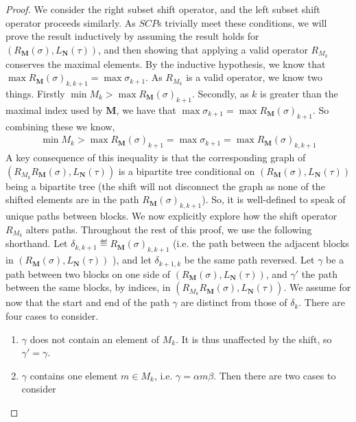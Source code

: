 \begin{proof}
We consider the right subset shift operator, and the left subset shift operator proceeds similarly.
As $SCP$s trivially meet these conditions, we will prove the result inductively by assuming the result holds for $(R_{\mathbf{M}}(\sigma),L_{\mathbf{N}}(\tau))$, and then showing that applying a valid operator $R_{M_k}$ conserves the maximal elements.
By the inductive hypothesis, we know that $\max R_{\mathbf{M}}(\sigma)_{k,k+1}= \max \sigma_{k+1}$.
As $R_{M_k}$ is a valid operator, we know two things.
Firstly $\min M_k > \max R_{\mathbf{M}}(\sigma)_{k+1}$.
Secondly, as $k$ is greater than the maximal index used by $\mathbf{M}$, we have that $\max \sigma_{k+1} = \max R_{\mathbf{M}}(\sigma)_{k+1}$.
So combining these we know, 
\begin{align}\label{eq:shift subset dominates adj path}
    \min M_k > \max R_{\mathbf{M}}(\sigma)_{k+1} = \max \sigma_{k+1} = \max R_{\mathbf{M}}(\sigma)_{k,k+1}
\end{align}
A key consequence of this inequality is that the corresponding graph of $(R_{M_k}R_{\mathbf{M}}(\sigma),L_{\mathbf{N}}(\tau))$ is a bipartite tree conditional on $(R_{\mathbf{M}}(\sigma),L_{\mathbf{N}}(\tau))$ being a bipartite tree (the shift will not disconnect the graph as none of the shifted elements are in the path $R_{\mathbf{M}}(\sigma)_{k,k+1}$). So, it is well-defined to speak of unique paths between blocks. 
We now explicitly explore how the shift operator $R_{M_k}$ alters paths. 
Throughout the rest of this proof, we use the following shorthand. 
Let $\delta_{k,k+1} \eqdef  R_{\mathbf{M}}(\sigma)_{k,k+1}$ (i.e. the path between the adjacent blocks in $(R_{\mathbf{M}}(\sigma),L_{\mathbf{N}}(\tau))$ ), and let $\delta_{k+1,k}$ be the same path reversed.
Let $\gamma$ be a path between two blocks on one side of $(R_{\mathbf{M}}(\sigma),L_{\mathbf{N}}(\tau))$, and $\gamma'$ the path between the same blocks, by indices, in $(R_{M_k}R_{\mathbf{M}}(\sigma),L_{\mathbf{N}}(\tau))$. 
We assume for now that the start and end of the path $\gamma$ are distinct from those of $\delta_k$.
There are four cases to consider. 
\begin{enumerate}
    \item $\gamma$ does not contain an element of $M_k$.
    It is thus unaffected by the shift, so $\gamma' = \gamma$.
    \item $\gamma$ contains one element $m\in M_k$, i.e. $\gamma = \alpha m \beta$.
    Then there are two cases to consider
    \begin{enumerate}

\end{enumerate}
\end{enumerate}
\end{proof}
